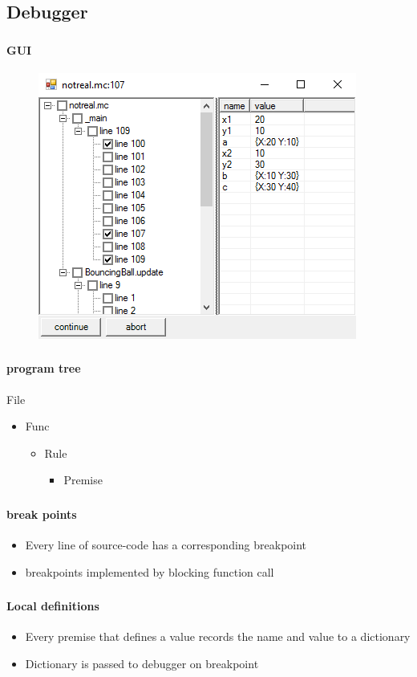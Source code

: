\subsection{Debugger}

\begin{frame}
    \frametitle{\subsecname}
    \framesubtitle{GUI}
    \begin{figure}
        \includegraphics[scale=0.5]{debugger}
    \end{figure}
\end{frame}

\begin{frame}
    \frametitle{\subsecname}
    \framesubtitle{program tree}
    File
    \begin{itemize}
        \item Func
        \begin{itemize}
            \item Rule
            \begin{itemize}
                \item Premise
            \end{itemize}
        \end{itemize}
    \end{itemize}
\end{frame}

\begin{frame}
    \frametitle{\subsecname}
    \framesubtitle{break points}
    \begin{itemize}
        \item Every line of source-code has a corresponding breakpoint
        \item breakpoints implemented by blocking function call
    \end{itemize}
\end{frame}

\begin{frame}
    \frametitle{\subsecname}
    \framesubtitle{Local definitions}
    \begin{itemize}
        \item Every premise that defines a value records the name and value to a dictionary
        \item Dictionary is passed to debugger on breakpoint
    \end{itemize}

\end{frame}

